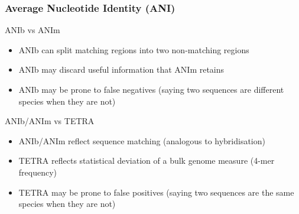 %
\begin{frame}
  \frametitle{Average Nucleotide Identity (ANI)}
  \textcolor{hutton_green}{ANIb vs ANIm}
  \begin{itemize}
    \item ANIb can split matching regions into two non-matching regions
    \item ANIb may discard useful information that ANIm retains
    \item ANIb may be prone to false negatives (saying two sequences are different species when they are not)
  \end{itemize}
  \textcolor{hutton_blue}{ANIb/ANIm vs TETRA}
  \begin{itemize}
    \item ANIb/ANIm reflect sequence matching (analogous to hybridisation)
    \item TETRA reflects statistical deviation of a bulk genome measure (4-mer frequency)
    \item TETRA may be prone to false positives (saying two sequences are the same species when they are not)
  \end{itemize}  
\end{frame}
